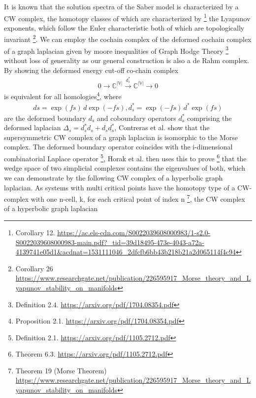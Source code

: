 \documentclass{article}
\begin{document}
It is known that the solution spectra of the Saber model is characterized by a CW complex, the homotopy classes of which are characterized by \footnote{Corollary 12. \url{https://ac.els-cdn.com/S0022039608000983/1-s2.0-S0022039608000983-main.pdf?_tid=39d18495-473e-4043-a72a-4139741e05d1&acdnat=1531111046_2dfcfb6bb43b218b21a2d065114f4c94}}  the Lyapunov exponents, which follow the Euler characteristic both of which are topologically invariant \footnote{Corollary 26 \url{https://www.researchgate.net/publication/226595917_Morse_theory_and_Lyapunov_stability_on_manifolds}}. We can employ the cochain complex of the deformed cochain complex of a graph laplacian given by moore inequalities of Graph Hodge Theory \footnote{Definition 2.4. \url{https://arxiv.org/pdf/1704.08354.pdf}} without loss of generality as our general construction is also a de Rahm complex. By showing the deformed energy cut-off co-chain complex
\begin{equation} \label{eq1}
\begin{split}
0 \rightarrow \mathbb{C^{|V|}} \xrightarrow{d^{*}_s} \mathbb{C^{|V|}} \rightarrow 0
\end{split}
\end{equation}
is equivalent for all homologies\footnote{Proposition 2.1. \url{https://arxiv.org/pdf/1704.08354.pdf}}, where
\begin{equation} \label{eq1}
\begin{split}
ds = \exp(fs)\, d \exp(-fs), d^{*}_s = \exp(-fs)\, d^*\exp(fs)
\end{split}
\end{equation}
are the deformed boundary $d_s$ and coboundary operators $d^{*}_s$ comprising the deformed laplacian $\Delta_s = d^{*}_s d_s + d_s d^{*}_s$, Contreras et al. show that the supersymmetric CW complex of a graph laplacian is isomorphic to the Morse complex. The deformed boundary operator coincides with the i-dimensional combinatorial Laplace operator \footnote{Definition 2.1. \url{https://arxiv.org/pdf/1105.2712.pdf}}, Horak et al. then uses this to prove \footnote{Theorem 6.3. \url{https://arxiv.org/pdf/1105.2712.pdf}} that the wedge space of two simplicial complexes contains the eigenvalues of both, which we can demonstrate by the following CW complex of a hyperbolic graph laplacian. As systems with multi critical points have the homotopy type of a CW-complex with one n-cell, k, for each critical point of index n \footnote{Theorem 19 (Morse Theorem) \url{https://www.researchgate.net/publication/226595917_Morse_theory_and_Lyapunov_stability_on_manifolds}}, the CW complex of a hyperbolic graph laplacian
\end{document}
